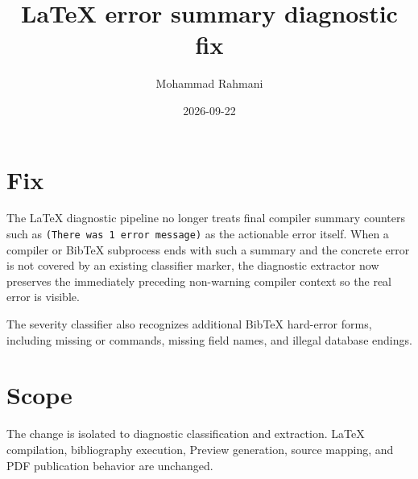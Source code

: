 \documentclass[a4paper]{article}
\title{LaTeX error summary diagnostic fix}
\date{2026-09-22}
\author{Mohammad Rahmani}
\begin{document}
\maketitle

\section{Fix}
The LaTeX diagnostic pipeline no longer treats final compiler summary counters such as \texttt{(There was 1 error message)} as the actionable error itself. When a compiler or BibTeX subprocess ends with such a summary and the concrete error is not covered by an existing classifier marker, the diagnostic extractor now preserves the immediately preceding non-warning compiler context so the real error is visible.

The severity classifier also recognizes additional BibTeX hard-error forms, including missing \texttt{\string\bibstyle} or \texttt{\string\bibdata} commands, missing field names, and illegal database endings.

\section{Scope}
The change is isolated to diagnostic classification and extraction. LaTeX compilation, bibliography execution, Preview generation, source mapping, and PDF publication behavior are unchanged.
\end{document}
